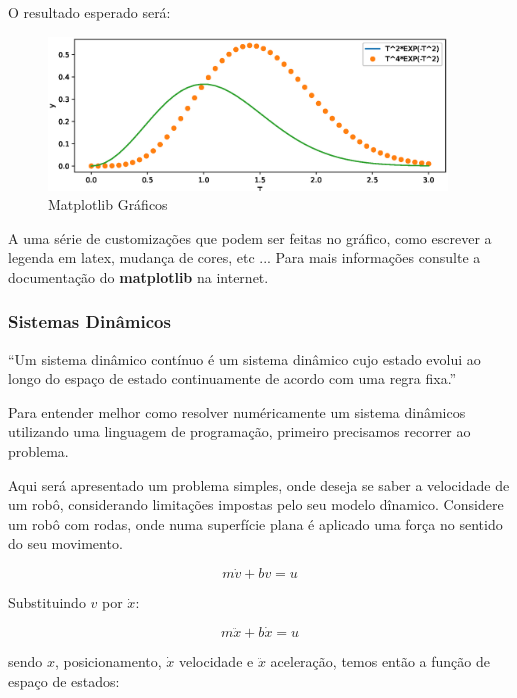O resultado esperado será:

\begin{figure}[htb]
    \includegraphics[width=300pt]{chapters/chapter0/figures/python_graph.eps}
    \caption[Desenhando Gráficos Manualmente]{Matplotlib Gráficos}
\end{figure}

A uma série de customizações que podem ser feitas no gráfico, como escrever a legenda em latex, mudança de cores, etc ... Para mais informações consulte a documentação do 
\textbf{matplotlib} na internet.

\subsubsection{Sistemas Dinâmicos}

\begin{VF}
    ``Um sistema dinâmico contínuo é um sistema dinâmico cujo estado evolui ao longo do espaço de estado continuamente de acordo com uma regra fixa.''
    
    \end{VF}

Para entender melhor como resolver numéricamente um sistema dinâmicos utilizando uma linguagem de programação, primeiro precisamos recorrer ao problema.

Aqui será apresentado um problema simples, onde deseja se saber a velocidade de um robô, considerando limitações impostas pelo seu modelo dînamico.
Considere um robô com rodas, onde numa superfície plana é aplicado uma força no sentido do seu movimento.

\begin{equation*}
    m\dot{v}+bv=u
\end{equation*}

Substituindo $v$ por $\dot{x}$:

\begin{equation*}
    m\ddot{x}+b\dot{x}=u
\end{equation*}

sendo $x$, posicionamento, $\dot{x}$ velocidade e $\ddot{x}$ aceleração, temos então a função de espaço de estados:

